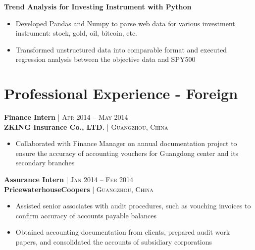 \documentclass[10pt]{article} %
\begin{document}
{\begin{minipage}[t]{0.47\textwidth}
\begin{itemize}[leftmargin=*, topsep=2pt, partopsep=2.5pt]
    
\end{itemize}


{\raggedright\normalsize
\textbf{Trend Analysis for Investing Instrument with Python}}

\begin{itemize}[leftmargin=*, topsep=2pt, partopsep=2.5pt]
\setlength\itemsep{1pt}
\item Developed Pandas and Numpy to parse web data for various investment instrument: stock, gold, oil, bitcoin, etc.    
\item Transformed unstructured data into comparable format and executed regression analysis between the objective data and SPY500

    
\end{itemize}


\section{Professional Experience - Foreign} 




{\raggedright\normalsize
\textbf{Finance Intern} {\hfill\footnotesize\textsc{| Apr 2014 -- May 2014}} \\ 
\textbf{ZKING Insurance Co., LTD.} {\hfill\footnotesize\textsc{| Guangzhou, China}}
}

\begin{itemize}[leftmargin=*, topsep=2pt, partopsep=2.5pt]
\setlength\itemsep{1pt}
\item Collaborated with Finance Manager on annual documentation project to ensure the accuracy of accounting vouchers for Guangdong center and its secondary branches 
\end{itemize}


{\raggedright\normalsize
\textbf{Assurance Intern} {\hfill\footnotesize\textsc{| Jan 2014 -- Feb 2014}} \\ 
\textbf{PricewaterhouseCoopers} {\hfill\footnotesize\textsc{| Guangzhou, China}}
}

\begin{itemize}[leftmargin=*, topsep=2pt, partopsep=2.5pt]
\setlength\itemsep{1pt}
\item Assisted senior associates with audit procedures, such as vouching invoices to confirm accuracy of accounts payable balances  
\item Obtained accounting documentation from clients, prepared audit work papers, and consolidated the accounts of subsidiary corporations   
\end{itemize}


\end{minipage}}
\end{document}
